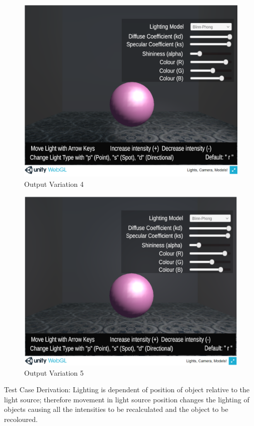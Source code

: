 \documentclass[12pt, titlepage]{article}
\begin{document}
\begin{enumerate}
	\begin{figure}[h]
	\centering
	\includegraphics[scale=0.25]{./images/sphere-lit-spotlight-moveValidR}
	\caption{Output Variation 4}
	\label{fig:spotlight-move-right}
	\end{figure}	
	
	\begin{figure}[h]
		\centering
		\includegraphics[scale=0.25]{./images/sphere-lit-point-moveValidR}
		\caption{Output Variation 5}
		\label{fig:point-move-right}
	\end{figure}	

	
	Test Case Derivation: Lighting is dependent of position of object relative 
	to the light source; therefore movement in light source position changes 
	the lighting of objects causing all the intensities to be recalculated and 
	the object to be recoloured.
	

\end{enumerate}
\end{document}
